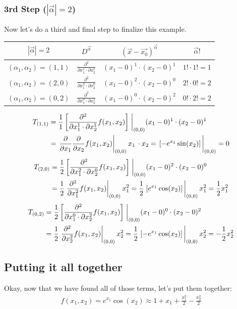 \subsubsection*{3rd Step ($|\vec{\alpha}|=2$)}
Now let's do a third and final step to finalize this example.
\begin{table}[h!]
	\centering
	\renewcommand{\arraystretch}{1.5} 
	\begin{tabular}{cccc}
		\hline
		$|\vec{\alpha}|=2$ & $D^{\vec{\alpha}}$ & $\left(\vec{x}-\vec{x_0}\right)^{\vec{\alpha}}$& $\vec{\alpha}!$\\
		\hline
		$(\alpha_1, \alpha_2)=(1, 1)$&$\frac{\partial^2}{\partial x_1^{1}\cdot \partial x_2^{1}}$& $(x_1-0)^1\cdot(x_2-0)^1$ &$1!\cdot 1! = 1$\\
		$(\alpha_1, \alpha_2)=(2, 0)$&$\frac{\partial^2}{\partial x_1^{2}\cdot \partial x_2^{0}}$& $(x_1-0)^2\cdot(x_2-0)^0$ &$2!\cdot 0! = 2$\\
		$(\alpha_1, \alpha_2)=(0, 2)$&$\frac{\partial^2}{\partial x_1^{0}\cdot \partial x_2^{2}}$& $(x_1-0)^0\cdot(x_2-0)^2$ &$0!\cdot 2! = 2$
	\end{tabular}
	\label{tab:taylor_example_3}
\end{table}
\begin{align}
	T_{(1,1)}&=\frac{1}{1}\left[\frac{\partial^2}{\partial x_1^{1}\cdot \partial x_2^{1}}f(x_1, x_2)\right]\eval_{(0,0)}(x_1-0)^1\cdot(x_2-0)^1\\
	&=\eval{\frac{\partial}{\partial x_1}\frac{\partial}{\partial x_2}f(x_1,x_2)}_{(0,0)}x_1\, \cdot x_2=  \eval{\left[-e^{x_1}\sin(x_2)\right]}_{(0,0)}= 0
\end{align}
\begin{align}
	T_{(2,0)}&=\frac{1}{2}\left[\frac{\partial^2}{\partial x_1^{2}\cdot \partial x_2^{0}}f(x_1, x_2)\right]\eval_{(0,0)}(x_1-0)^2\cdot(x_2-0)^0\\
	&=\frac{1}{2}\eval{\frac{\partial^2}{\partial x_1^2}f(x_1,x_2)}_{(0,0)}x_1^2 =  \frac{1}{2}\eval{\left[e^{x_1}\cos(x_2)\right]}_{(0,0)}x_1^2=\frac{1}{2}x_1^2
\end{align}
\begin{align}
	T_{(0,2)}&=\frac{1}{2}\left[\frac{\partial^2}{\partial x_1^{0}\cdot \partial x_2^{2}}f(x_1, x_2)\right]\eval_{(0,0)}(x_1-0)^0\cdot(x_2-0)^2\\
	&=\frac{1}{2}\eval{\frac{\partial^2}{\partial x_2^2}f(x_1,x_2)}_{(0,0)}x_2^2 = \frac{1}{2} \eval{\left[-e^{x_1}\cos(x_2)\right]}_{(0,0)}x_2^2=-\frac{1}{2}x_2^2
\end{align}
\subsection*{Putting it all together}
Okay, now that we have found all of those terms, let's put them together:
\begin{align}
	f(x_1, x_2)=e^{x_1} \cos(x_2)  \approx 1+ x_1+ \frac{x_1^2}{2}-\frac{x_2^2}{2} 
\end{align}